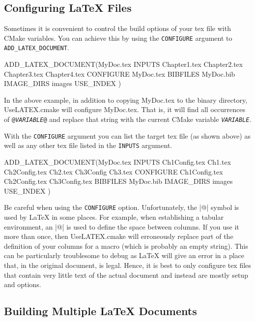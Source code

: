 \documentclass{article}
\newcommand*{\textfile}[1]{\textsf{#1}}
\newcommand*{\textcmake}[1]{\texttt{#1}}
\newcommand*{\textcmakevar}[1]{\textcmake{#1}}
\newcommand*{\textvar}[1]{\textit{#1}}
\newcommand*{\UseLATEX}{\textfile{UseLATEX.cmake}\xspace}
\newcommand*{\latex}{\LaTeX\xspace}
\newcommand*{\ald}{\textcmake{ADD\_LATEX\_DOCUMENT}\xspace}
\begin{document}
  \subsection{Configuring \latex Files}
  \label{sec:ConfiguringLatexFiles}

  Sometimes it is convenient to control the build options of your tex file
  with CMake variables. You can achieve this by using the
  \textcmake{CONFIGURE} argument to \ald.

  \begin{CodeListing}
ADD_LATEX_DOCUMENT(MyDoc.tex
  INPUTS Chapter1.tex Chapter2.tex Chapter3.tex Chapter4.tex
  CONFIGURE MyDoc.tex
  BIBFILES MyDoc.bib
  IMAGE_DIRS images
  USE_INDEX
  )
  \end{CodeListing}

  In the above example, in addition to copying \textfile{MyDoc.tex} to the
  binary directory, \UseLATEX will configure \textfile{MyDoc.tex}. That is,
  it will find all occurrences of \textcmake{@\textvar{VARIABLE}@} and
  replace that string with the current CMake variable
  \textcmakevar{\textvar{VARIABLE}}.

  With the \textcmake{CONFIGURE} argument you can list the target tex file
  (as shown above) as well as any other tex file listed in the
  \textcmake{INPUTS} argument.

  \begin{CodeListing}
ADD_LATEX_DOCUMENT(MyDoc.tex
  INPUTS Ch1Config.tex Ch1.tex Ch2Config.tex
         Ch2.tex Ch3Config Ch3.tex
  CONFIGURE Ch1Config.tex Ch2Config.tex Ch3Config.tex
  BIBFILES MyDoc.bib
  IMAGE_DIRS images
  USE_INDEX
  )
  \end{CodeListing}

  Be careful when using the \textcmake{CONFIGURE} option. Unfortunately,
  the \textlatex|@| symbol is used by \latex in some places. For example,
  when establishing a tabular environment, an \textlatex|@| is used to
  define the space between columns. If you use it more than once, then
  \UseLATEX will erroneously replace part of the definition of your columns
  for a macro (which is probably an empty string). This can be particularly
  troublesome to debug as \latex will give an error in a place that, in the
  original document, is legal. Hence, it is best to only configure tex
  files that contain very little text of the actual document and instead
  are mostly setup and options.

  \subsection{Building Multiple \latex Documents}
  \label{sec:BuldingMultipleLatexDocuments}
\end{document}
